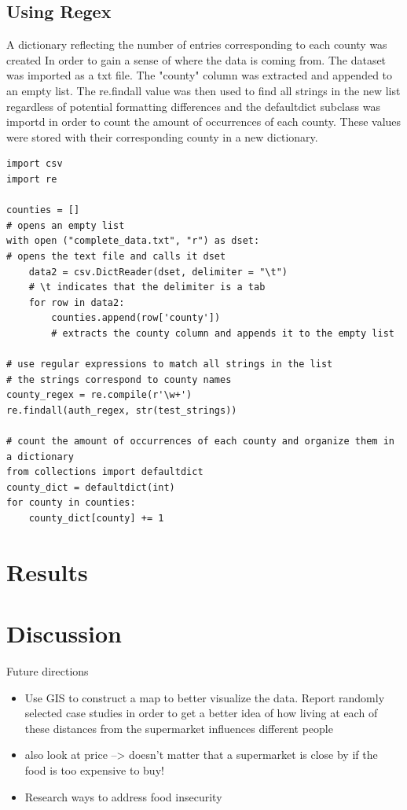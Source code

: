 \documentclass[letterpaper]{article} %
\begin{document}
\subsection{Using Regex}

A dictionary reflecting the number of entries corresponding to each county was created In order to gain a sense of where the data is coming from. The dataset was imported as a txt file. The "county" column was extracted and appended to an empty list. The re.findall value was then used to find all strings in the new list regardless of potential formatting differences and the defaultdict subclass was importd in order to count the amount of occurrences of each county. These values were stored with their corresponding county in a new dictionary. 

\lstset{language=Python}
\begin{lstlisting}[frame=single]
import csv
import re

counties = []
# opens an empty list
with open ("complete_data.txt", "r") as dset:
# opens the text file and calls it dset
    data2 = csv.DictReader(dset, delimiter = "\t")
    # \t indicates that the delimiter is a tab
    for row in data2:
        counties.append(row['county'])
        # extracts the county column and appends it to the empty list

# use regular expressions to match all strings in the list 
# the strings correspond to county names 
county_regex = re.compile(r'\w+')
re.findall(auth_regex, str(test_strings))

# count the amount of occurrences of each county and organize them in a dictionary
from collections import defaultdict
county_dict = defaultdict(int)
for county in counties:
    county_dict[county] += 1
\end{lstlisting}

\section{Results}



\section{Discussion}

Future directions
\begin{itemize}\itemsep -.1cm\vspace{-.25cm}
	\item Use GIS to construct a map to better visualize the data. Report randomly selected case studies in order to get a better idea of how living at each of these distances from the supermarket influences different people
	\item also look at price --> doesn't matter that a supermarket is close by if the food is too expensive to buy!
	\item Research ways to address food insecurity
\end{itemize}
\end{document}

